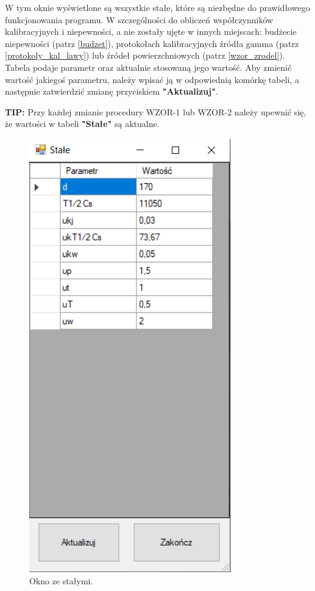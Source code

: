 W tym oknie wyświetlone są wszystkie stałe, które są niezbędne do prawidłowego funkcjonowania programu. W szczególności do obliczeń współczynników kalibracyjnych i niepewności, a nie zostały ujęte w innych miejscach: budżecie niepewności (patrz \ref{budzet}), protokołach kalibracyjnych źródła gamma (patrz \ref{protokoly_kal_lawy}) lub źródeł powierzchniowych (patrz \ref{wzor_zrodel}). Tabela podaje parametr oraz aktualnie stosowaną jego wartość. 
Aby zmienić wartość jakiegoś parametru, należy wpisać ją w odpowiednią komórkę tabeli, a następnie zatwierdzić zmianę przyciskiem \textbf{"Aktualizuj"}.

\textbf{TIP:} Przy każdej zmianie procedury WZOR-1 lub WZOR-2 należy upewnić się, że wartości w tabeli \textbf{"Stałe"} są aktualne.

\begin{figure}[htb]
	\centering
	\includegraphics{obrazki/Ustawienia/stale.png}
	\caption{Okno ze stałymi.}
	\label{staleOkno}
\end{figure}

